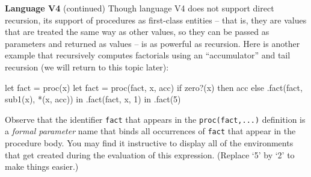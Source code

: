 \begin{minipage}[t]{\sw}
\slidenumber
\LARGE
{\bf Language V4} (continued)\exx
Though language V4 does not support direct recursion,
its support of procedures as first-class entities --
that is, they are values that are treated
the same way as other values,
so they can be passed as parameters and returned as values --
is as powerful as recursion.
Here is another example that recursively computes factorials
using an ``accumulator'' and tail recursion
(we will return to this topic later):
\Large
\begin{qv}
let
  fact = proc(x)
    let
      fact = proc(fact, x, acc)
        if zero?(x)
        then acc
        else .fact(fact, sub1(x), *(x, acc))
    in
      .fact(fact, x, 1)
  in
    .fact(5)
\end{qv}
\LARGE
Observe that the identifier \verb'fact' that appears
in the \verb'proc(fact,...)' definition
is a {\em formal parameter} name
that binds all occurrences of \verb'fact'
that appear in the procedure body.
You may find it instructive to display all of the environments
that get created during the evaluation of this expression.
(Replace `5' by `2' to make things easier.)
\end{minipage}
